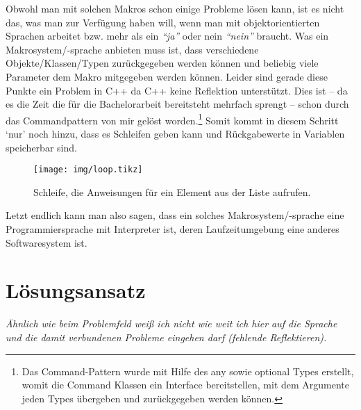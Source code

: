   Obwohl man mit solchen Makros schon einige Probleme lösen kann, ist es nicht das, was man zur Verfügung haben will, wenn man mit objektorientierten Sprachen arbeitet bzw. mehr als ein \textit{``ja''} oder nein \textit{``nein''} braucht. Was ein Makrosystem/-sprache anbieten muss ist, dass verschiedene Objekte/Klassen/Typen zurückgegeben werden können und beliebig viele Parameter dem Makro mitgegeben werden können. Leider sind gerade diese Punkte ein Problem in C++ da C++ keine Reflektion unterstützt. Dies ist -- da es die Zeit die für die Bachelorarbeit bereitsteht mehrfach sprengt -- schon durch das Commandpattern von mir gelöst worden.\footnote{
    Das Command-Pattern wurde mit Hilfe des any
    sowie optional
    Types erstellt, womit die Command Klassen ein Interface bereitstellen, mit dem Argumente jeden Types übergeben und zurückgegeben werden können.
  }\spewnotes{}
  Somit kommt in diesem Schritt `nur' noch hinzu, dass es Schleifen geben kann und Rückgabewerte in Variablen speicherbar sind.

  \begin{figure}[H]
    \centering
    \texttt{[image: img/loop.tikz]}
    \caption{Schleife, die Anweisungen für ein Element aus der Liste aufrufen.}
  \end{figure}

  Letzt endlich kann man also sagen, dass ein solches Makrosystem/-sprache eine Programmiersprache mit Interpreter ist, deren Laufzeitumgebung eine anderes Softwaresystem ist.

\section{Lösungsansatz}
\label{sec:loesungsansatz}
  \textit{%
    \color{DarkSlateGray}%
    Ähnlich wie beim Problemfeld weiß ich nicht wie weit ich hier auf die Sprache und die damit verbundenen Probleme eingehen darf (fehlende Reflektieren).
  }


